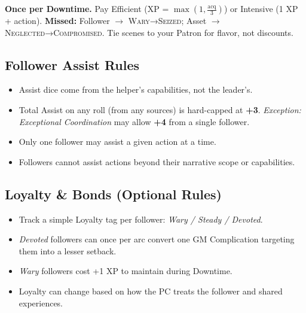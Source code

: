 \begin{tcolorbox}[title={Quick Reference},colback=gray!5,colframe=black]
\textbf{Once per Downtime.} Pay Efficient (XP = $\max(1, \tfrac{\text{acq}}{3})$) or Intensive (1 XP + action). \textbf{Missed:} Follower $\to$ \textsc{Wary}→\textsc{Seized}; Asset $\to$ \textsc{Neglected}→\textsc{Compromised}. Tie scenes to your Patron for flavor, not discounts.
\end{tcolorbox}

\subsection{Follower Assist Rules}
\label{subsec:follower-assist}

\begin{itemize}
    \item Assist dice come from the helper's capabilities, not the leader's. 
    \item Total Assist on any roll (from any sources) is hard-capped at \textbf{+3}. \emph{Exception:} \textit{Exceptional Coordination} may allow \textbf{+4} from a single follower. 
    \item Only one follower may assist a given action at a time. 
    \item Followers cannot assist actions beyond their narrative scope or capabilities.
\end{itemize}

\subsection{Loyalty \& Bonds (Optional Rules)}
\label{subsec:follower-loyalty}

\begin{itemize}
    \item Track a simple Loyalty tag per follower: \emph{Wary / Steady / Devoted}. 
    \item \emph{Devoted} followers can once per arc convert one GM Complication targeting them into a lesser setback. 
    \item \emph{Wary} followers cost +1 XP to maintain during Downtime. 
    \item Loyalty can change based on how the PC treats the follower and shared experiences.
\end{itemize}

